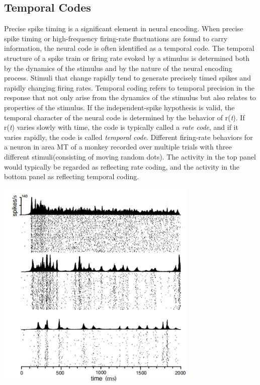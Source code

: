\subsection{Temporal Codes}
\rul Precise spike timing is a significant element in neural encoding. When precise spike timing or high-frequency firing-rate fluctuations are found to carry information, the neural code is often identified as a temporal code.
\rem The temporal structure of a spike train or firing rate evoked by a stimulus is determined both by the dynamics of the stimulus and by the nature of the neural encoding process. Stimuli that change rapidly tend to generate precisely timed spikes and rapidly changing firing rates.
\rem Temporal coding refers to temporal precision in the response that not only arise from the dynamics of the stimulus but also relates to properties of the stimulus.
\rul If the independent-spike hypothesis is valid, the temporal character of the neural code is determined by the behavior of r(\emph{t}).
 If r(\emph{t}) varies slowly with time, the code is typically called a \emph{rate code}, and if it varies rapidly, the code is called \emph{temporal code}.
\exm Different firing-rate behaviors for a neuron in area MT of a monkey recorded over multiple trials with three different stimuli(consisting of moving random dots). The activity in the top panel would typically be regarded as reflecting rate coding, and the activity in the bottom panel as reflecting temporal coding.
\begin{center}
    \label{fig:1.19}
    \includegraphics[scale = 0.6]{./png/Figure1-19}\\
\end{center}

